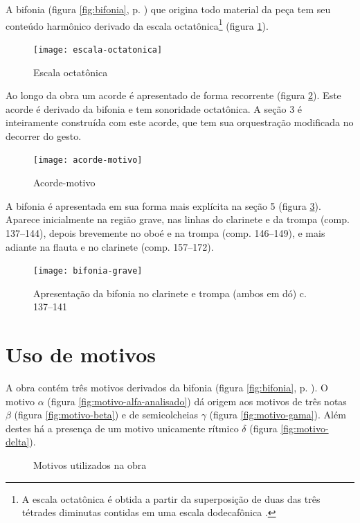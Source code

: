A bifonia (figura \ref{fig:bifonia}, p. \pageref{fig:bifonia}) que
origina todo material da peça tem seu conteúdo harmônico derivado da
escala octatônica\footnote{A escala octatônica é obtida a partir da
  superposição de duas das três tétrades diminutas contidas em uma
  escala dodecafônica \cite[p. 76]{antokoletz90:music}.} (figura
\ref{fig:escala-octatonica}).

\begin{figure}
  \centering
  \texttt{[image: escala-octatonica]}
  \caption{Escala octatônica}
  \label{fig:escala-octatonica}
\end{figure}

Ao longo da obra um acorde é apresentado de forma recorrente (figura
\ref{fig:acorde-motivo}). Este acorde é derivado da bifonia e tem
sonoridade octatônica. A seção 3 é inteiramente construída com este
acorde, que tem sua orquestração modificada no decorrer do gesto.

\begin{figure}
  \centering
  \texttt{[image: acorde-motivo]}
  \caption{Acorde-motivo}
  \label{fig:acorde-motivo}
\end{figure}

A bifonia é apresentada em sua forma mais explícita na seção 5 (figura
\ref{fig:bifonia-grave}). Aparece inicialmente na região grave, nas
linhas do clarinete e da trompa (comp. 137--144), depois brevemente no
oboé e na trompa (comp. 146--149), e mais adiante na flauta e no
clarinete (comp. 157--172).

\begin{figure}
  \centering
  \texttt{[image: bifonia-grave]}
  \caption{Apresentação da bifonia no clarinete e trompa (ambos em
    dó) c. 137--141}
  \label{fig:bifonia-grave}
\end{figure}
\section{Uso de motivos}
\label{sec:uso-de-motivos}

A obra contém três motivos derivados da bifonia (figura
\ref{fig:bifonia}, p. \pageref{fig:bifonia}). O motivo $\alpha$
(figura \ref{fig:motivo-alfa-analisado}) dá origem aos motivos de três
notas $\beta$ (figura \ref{fig:motivo-beta}) e de semicolcheias
$\gamma$ (figura \ref{fig:motivo-gama}). Além destes há a presença de
um motivo unicamente rítmico $\delta$ (figura \ref{fig:motivo-delta}).

\begin{figure}
  \centering


  \caption{Motivos utilizados na obra}
  \label{fig:motivos-utilizados}
\end{figure}

